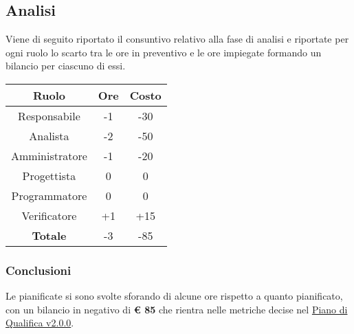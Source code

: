 \documentclass{scalatekids-article}
\begin{document}
\subsection{Analisi}
Viene di seguito riportato il consuntivo relativo alla fase di analisi e riportate per ogni ruolo lo
scarto tra le ore in preventivo e le ore impiegate formando un bilancio per ciascuno di essi.
\begin{center}
  \normalsize
  \begin{tabular}{| c | c | c |}
    \hline
    \textbf{Ruolo} & \textbf{Ore} & \textbf{Costo}\\
    \hline
    Responsabile & -1 & -30 \\
    Analista & -2 & -50\\
    Amministratore & -1 & -20\\
    Progettista & 0 & 0\\
    Programmatore & 0 & 0\\
    Verificatore & +1 & +15\\
    \hline
    \textbf{Totale} & -3 & -85\\
    \hline
  \end{tabular}
\end{center}

\subsubsection{Conclusioni}
Le  pianificate si sono svolte sforando di alcune ore rispetto a quanto pianificato, con un bilancio in negativo di \textbf{\euro{} 85} che rientra nelle metriche decise nel \href{run:PianoDiQualifica\_v2.0.0.pdf}{Piano di Qualifica v2.0.0}.
\end{document}
